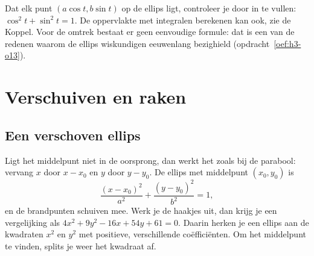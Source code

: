 Dat elk punt $(a\cos t, b\sin t)$ op de ellips ligt, controleer je door in te vullen: $\cos^2 t + \sin^2 t = 1$. De oppervlakte met integralen berekenen kan ook, zie de Koppel. Voor de omtrek bestaat er geen eenvoudige formule: dat is een van de redenen waarom de ellips wiskundigen eeuwenlang bezighield (opdracht~\ref{oef:h3-o13}).



\begin{oefeningen}
\end{oefeningen}

\section{Verschuiven en raken}

\subsection{Een verschoven ellips}

Ligt het middelpunt niet in de oorsprong, dan werkt het zoals bij de parabool: vervang $x$ door $x - x_0$ en $y$ door $y - y_0$. De ellips met middelpunt $(x_0, y_0)$ is
\[ \frac{(x - x_0)^2}{a^2} + \frac{(y - y_0)^2}{b^2} = 1 , \]
en de brandpunten schuiven mee. Werk je de haakjes uit, dan krijg je een vergelijking als $4x^2 + 9y^2 - 16x + 54y + 61 = 0$. Daarin herken je een ellips aan de kwadraten $x^2$ en $y^2$ met positieve, verschillende coëfficiënten. Om het middelpunt te vinden, splits je weer het kwadraat af.

